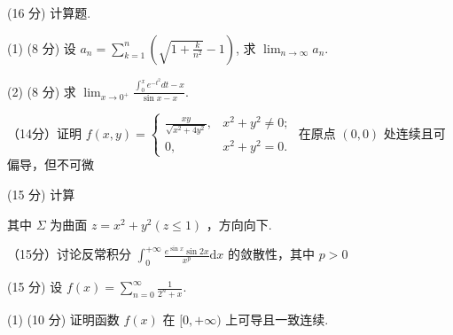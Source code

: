 \par{}
(16 分) 计算题.\par
(1) (8 分) 设 $a_{n} = \sum_{k=1}^{n}\left(\sqrt{1 + \frac{k}{n^{2}}} - 1\right)$, 求 $\lim_{n \to \infty} a_{n}$.\par
(2) (8 分) 求  $\lim_{x\to0^{+}}\frac{\int_{0}^{x}e^{-t^{2}}dt-x}{\sin x-x}.$\par
\par{}
（14分）证明 $f(x,y) = \left\{ \begin{array}{ll}\frac{xy}{\sqrt{x^2 + 4y^2}}, & x^2 +y^2\neq 0;\\ 0, & x^2 +y^2 = 0. \end{array} \right.$ 在原点 $(0,0)$ 处连续且可偏导，但不可微\par
\par{}
\par{}
(15 分) 计算\par
\nopagebreak[4]
其中  $\Sigma$  为曲面  $z = x^{2} + y^{2} (z \leq 1)$ ，方向向下.\par
\par{}
（15分）讨论反常积分 $\int_0^{+\infty}\frac{e^{\sin x}\sin 2x}{x^p}\mathrm{d}x$ 的敛散性，其中 $p > 0$\par
\par{}
(15 分) 设 $f(x) = \sum_{n=0}^{\infty} \frac{1}{2^n + x}$.\par
(1) (10 分) 证明函数 $f(x)$ 在 $[0, +\infty)$ 上可导且一致连续.\par
